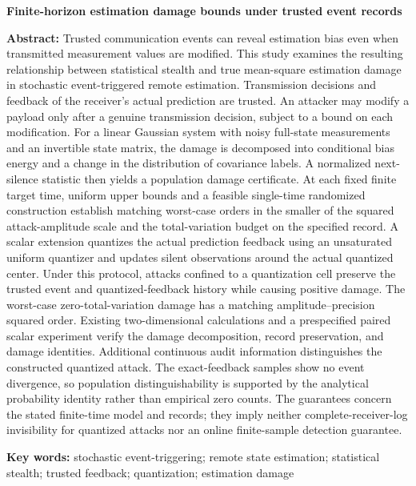 \bigskip
\begin{center}
{\large\bfseries Finite-horizon estimation damage bounds under trusted event records\par}
\end{center}
\noindent\textbf{Abstract:}
Trusted communication events can reveal estimation bias even when transmitted measurement values are modified. This study examines the resulting relationship between statistical stealth and true mean-square estimation damage in stochastic event-triggered remote estimation. Transmission decisions and feedback of the receiver's actual prediction are trusted. An attacker may modify a payload only after a genuine transmission decision, subject to a bound on each modification. For a linear Gaussian system with noisy full-state measurements and an invertible state matrix, the damage is decomposed into conditional bias energy and a change in the distribution of covariance labels. A normalized next-silence statistic then yields a population damage certificate. At each fixed finite target time, uniform upper bounds and a feasible single-time randomized construction establish matching worst-case orders in the smaller of the squared attack-amplitude scale and the total-variation budget on the specified record. A scalar extension quantizes the actual prediction feedback using an unsaturated uniform quantizer and updates silent observations around the actual quantized center. Under this protocol, attacks confined to a quantization cell preserve the trusted event and quantized-feedback history while causing positive damage. The worst-case zero-total-variation damage has a matching amplitude--precision squared order. Existing two-dimensional calculations and a prespecified paired scalar experiment verify the damage decomposition, record preservation, and damage identities. Additional continuous audit information distinguishes the constructed quantized attack. The exact-feedback samples show no event divergence, so population distinguishability is supported by the analytical probability identity rather than empirical zero counts. The guarantees concern the stated finite-time model and records; they imply neither complete-receiver-log invisibility for quantized attacks nor an online finite-sample detection guarantee.

\smallskip
\noindent\textbf{Key words:} stochastic event-triggering; remote state estimation; statistical stealth; trusted feedback; quantization; estimation damage
